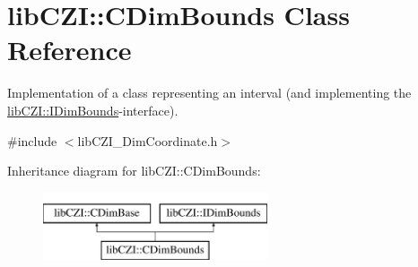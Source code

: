 \hypertarget{classlib_c_z_i_1_1_c_dim_bounds}{}\section{lib\+C\+ZI\+:\+:C\+Dim\+Bounds Class Reference}
\label{classlib_c_z_i_1_1_c_dim_bounds}


Implementation of a class representing an interval (and implementing the {\ttfamily \hyperlink{classlib_c_z_i_1_1_i_dim_bounds}{lib\+C\+Z\+I\+::\+I\+Dim\+Bounds}}-\/interface).  




{\ttfamily \#include $<$lib\+C\+Z\+I\+\_\+\+Dim\+Coordinate.\+h$>$}

Inheritance diagram for lib\+C\+ZI\+:\+:C\+Dim\+Bounds\+:\begin{figure}[H]
\begin{center}
\leavevmode
\includegraphics[height=2.000000cm]{classlib_c_z_i_1_1_c_dim_bounds}
\end{center}
\end{figure}
